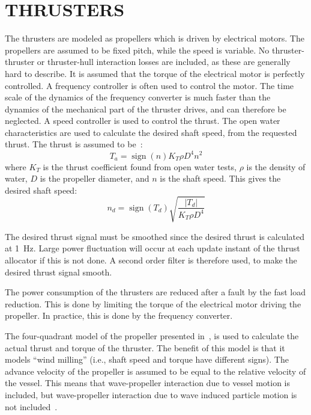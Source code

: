 \documentclass[twocolumn,10pt]{asme2e}
\begin{document}
\section*{\uppercase{Thrusters}}
The thrusters are modeled as propellers which is driven by electrical motors.
The propellers are assumed to be fixed pitch, while the speed is variable.
No thruster-thruster or thruster-hull interaction losses are included, as these are generally hard to describe.
It is assumed that the torque of the electrical motor is perfectly controlled.
A frequency controller is often used to control the motor.
The time scale of the dynamics of the frequency converter is much faster than the dynamics of the mechanical part of the thruster drives, and can therefore be neglected.
A speed controller is used to control the thrust. 
The open water characteristics are used to calculate the desired shaft speed, from the requested thrust.
The thrust is assumed to be~\cite{Sorensen2011}:
\begin{equation}
T_a = \operatorname{sign}(n)K_T \rho D^4 n^2 
\end{equation}
where $K_T$ is the thrust coefficient found from open water tests, $\rho$ is the density of water, $D$ is the propeller diameter, and $n$ is the shaft speed.
This gives the desired shaft speed:
\begin{equation}
n_d = \operatorname{sign}(T_d) \sqrt{\frac{|T_d|}{K_T \rho D^4}}
\end{equation}

The desired thrust signal must be smoothed since the desired thrust is calculated at 1~Hz.
Large power fluctuation will occur at each update instant of the thrust allocator if this is not done.
A second order filter is therefore used, to make the desired thrust signal smooth.

The power consumption of the thrusters are reduced after a fault by the fast load reduction.
This is done by limiting the torque of the electrical motor driving the propeller.
In practice, this is done by the frequency converter.

The four-quadrant model of the propeller presented in~\cite{Smogeli2006}, is used to calculate the actual thrust and torque of the thruster.
The benefit of this model is that it models ``wind milling'' (i.e., shaft speed and torque have different signs).
The advance velocity of the propeller is assumed to be equal to the relative velocity of the vessel.
This means that wave-propeller interaction due to vessel motion is included, but wave-propeller interaction due to wave induced particle motion is not included~\cite{Sorensen2009}.
\end{document}
